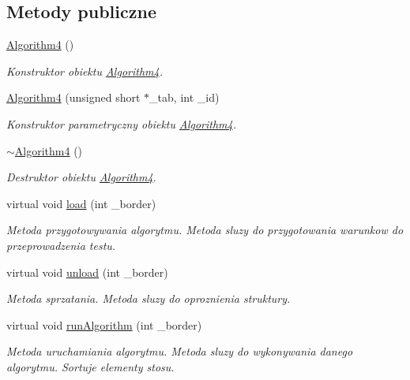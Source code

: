 \subsection*{Metody publiczne}
\begin{DoxyCompactItemize}
\item 
\hyperlink{class_algorithm4_a79f0bdede29ae14437031022b7a32278}{Algorithm4} ()
\begin{DoxyCompactList}\small\item\em Konstruktor obiektu \hyperlink{class_algorithm4}{Algorithm4}. \end{DoxyCompactList}\item 
\hyperlink{class_algorithm4_a7e9812499c980dfc9e2032d1a3728b09}{Algorithm4} (unsigned short $\ast$\-\_\-tab, int \-\_\-id)
\begin{DoxyCompactList}\small\item\em Konstruktor parametryczny obiektu \hyperlink{class_algorithm4}{Algorithm4}. \end{DoxyCompactList}\item 
\hyperlink{class_algorithm4_ad73b6bd1ca2b289db737e3e4f5b40abf}{$\sim$\-Algorithm4} ()
\begin{DoxyCompactList}\small\item\em Destruktor obiektu \hyperlink{class_algorithm4}{Algorithm4}. \end{DoxyCompactList}\item 
virtual void \hyperlink{class_algorithm4_aa86adbf6be3052692f885c1be28b2300}{load} (int \-\_\-border)
\begin{DoxyCompactList}\small\item\em Metoda przygotowywania algorytmu. Metoda sluzy do przygotowania warunkow do przeprowadzenia testu. \end{DoxyCompactList}\item 
virtual void \hyperlink{class_algorithm4_a673e2d2373378ab01a7f0378d978f162}{unload} (int \-\_\-border)
\begin{DoxyCompactList}\small\item\em Metoda sprzatania. Metoda sluzy do oproznienia struktury. \end{DoxyCompactList}\item 
virtual void \hyperlink{class_algorithm4_ad1e715e2d6ddec7607f3cafa77443cd2}{run\-Algorithm} (int \-\_\-border)
\begin{DoxyCompactList}\small\item\em Metoda uruchamiania algorytmu. Metoda sluzy do wykonywania danego algorytmu. Sortuje elementy stosu. \end{DoxyCompactList}\end{DoxyCompactItemize}
